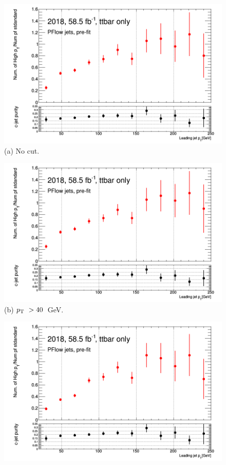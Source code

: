 \documentclass[letterpaper,12pt]{article}
\begin{document}
\begin{figure}[!h]
\begin{minipage}[b]{.45\textwidth}
\centering
\includegraphics[width=1\textwidth]{stat_gains/statsgain_0GeV.png}
\footnotesize (a) No cut.
\end{minipage}\hfill
\begin{minipage}[b]{.45\textwidth}
\centering
\includegraphics[width=1\textwidth]{stat_gains/statsgain_40GeV.png}
\footnotesize (b) $\pt\ > 40$~GeV.
\end{minipage}\hfill
\begin{minipage}[b]{.45\textwidth}
\centering
\includegraphics[width=1\textwidth]{stat_gains/statsgain_70GeV.png}

\end{minipage}
\end{figure}
\end{document}
